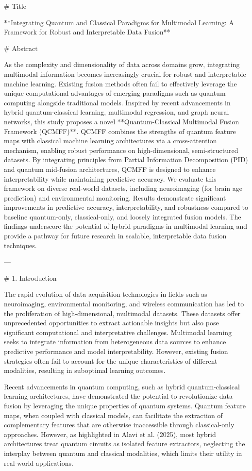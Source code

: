 # Title

**Integrating Quantum and Classical Paradigms for Multimodal Learning: A Framework for Robust and Interpretable Data Fusion**

# Abstract

As the complexity and dimensionality of data across domains grow, integrating multimodal information becomes increasingly crucial for robust and interpretable machine learning. Existing fusion methods often fail to effectively leverage the unique computational advantages of emerging paradigms such as quantum computing alongside traditional models. Inspired by recent advancements in hybrid quantum-classical learning, multimodal regression, and graph neural networks, this study proposes a novel **Quantum-Classical Multimodal Fusion Framework (QCMFF)**. QCMFF combines the strengths of quantum feature maps with classical machine learning architectures via a cross-attention mechanism, enabling robust performance on high-dimensional, semi-structured datasets. By integrating principles from Partial Information Decomposition (PID) and quantum mid-fusion architectures, QCMFF is designed to enhance interpretability while maintaining predictive accuracy. We evaluate this framework on diverse real-world datasets, including neuroimaging (for brain age prediction) and environmental monitoring. Results demonstrate significant improvements in predictive accuracy, interpretability, and robustness compared to baseline quantum-only, classical-only, and loosely integrated fusion models. The findings underscore the potential of hybrid paradigms in multimodal learning and provide a pathway for future research in scalable, interpretable data fusion techniques.

---

# 1. Introduction

The rapid evolution of data acquisition technologies in fields such as neuroimaging, environmental monitoring, and wireless communication has led to the proliferation of high-dimensional, multimodal datasets. These datasets offer unprecedented opportunities to extract actionable insights but also pose significant computational and interpretative challenges. Multimodal learning seeks to integrate information from heterogeneous data sources to enhance predictive performance and model interpretability. However, existing fusion strategies often fail to account for the unique characteristics of different modalities, resulting in suboptimal learning outcomes.

Recent advancements in quantum computing, such as hybrid quantum-classical learning architectures, have demonstrated the potential to revolutionize data fusion by leveraging the unique properties of quantum systems. Quantum feature maps, when coupled with classical models, can facilitate the extraction of complementary features that are otherwise inaccessible through classical-only approaches. However, as highlighted in Alavi et al. (2025), most hybrid architectures treat quantum circuits as isolated feature extractors, neglecting the interplay between quantum and classical modalities, which limits their utility in real-world applications.

